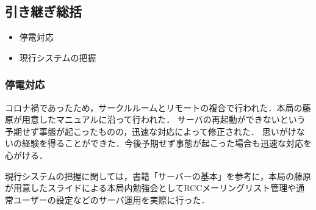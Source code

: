 \subsection*{引き継ぎ総括}


\begin{itemize}
	\item 停電対応
	\item 現行システムの把握
\end{itemize}

\subsubsection*{停電対応}
コロナ禍であったため，サークルルームとリモートの複合で行われた．本局の藤原が用意したマニュアルに沿って行われた．
サーバの再起動ができないという予期せず事態が起こったものの，迅速な対応によって修正された．
思いがけないの経験を得ることができた．今後予期せず事態が起こった場合も迅速な対応を心がける．

現行システムの把握に関しては，書籍「サーバーの基本」を参考に，本局の藤原が用意したスライドによる本局内勉強会としてRCCメーリングリスト管理や通常ユーザーの設定などのサーバ運用を実際に行った．

